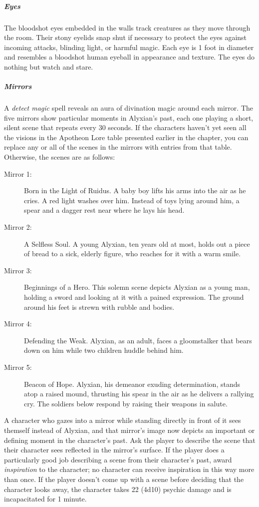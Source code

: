 \documentclass[10pt,a4paper,twoside,bg=print,twocolumn,openany,nodeprecatedcode]{dndbook}
\begin{document}
\subparagraph{Eyes}
The bloodshot eyes embedded in the walls track creatures as they move through the room. Their stony eyelids snap shut if necessary to protect the eyes against incoming attacks, blinding light, or harmful magic. Each eye is 1 foot in diameter and resembles a bloodshot human eyeball in appearance and texture. The eyes do nothing but watch and stare.

\subparagraph{Mirrors}
A \textit{detect magic} spell reveals an aura of divination magic around each mirror. The five mirrors show particular moments in Alyxian's past, each one playing a short, silent scene that repeats every 30 seconds. If the characters haven't yet seen all the visions in the Apotheon Lore table presented earlier in the chapter, you can replace any or all of the scenes in the mirrors with entries from that table. Otherwise, the scenes are as follows:


\begin{description}
\item[Mirror 1:]
Born in the Light of Ruidus. A baby boy lifts his arms into the air as he cries. A red light washes over him. Instead of toys lying around him, a spear and a dagger rest near where he lays his head.
\item[Mirror 2:]
A Selfless Soul. A young Alyxian, ten years old at most, holds out a piece of bread to a sick, elderly figure, who reaches for it with a warm smile.
\item[Mirror 3:]
Beginnings of a Hero. This solemn scene depicts Alyxian as a young man, holding a sword and looking at it with a pained expression. The ground around his feet is strewn with rubble and bodies.
\item[Mirror 4:]
Defending the Weak. Alyxian, as an adult, faces a gloomstalker that bears down on him while two children huddle behind him.
\item[Mirror 5:]
Beacon of Hope. Alyxian, his demeanor exuding determination, stands atop a raised mound, thrusting his spear in the air as he delivers a rallying cry. The soldiers below respond by raising their weapons in salute.
\end{description}

A character who gazes into a mirror while standing directly in front of it sees themself instead of Alyxian, and that mirror's image now depicts an important or defining moment in the character's past. Ask the player to describe the scene that their character sees reflected in the mirror's surface. If the player does a particularly good job describing a scene from their character's past, award \textit{inspiration} to the character; no character can receive inspiration in this way more than once. If the player doesn't come up with a scene before deciding that the character looks away, the character takes 22 (4d10) psychic damage and is incapacitated for 1 minute.
\end{document}
